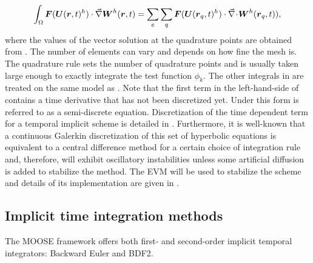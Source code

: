 %
\begin{align}\label{en:va_system_weak5}
\int_\Omega \boldsymbol F(\boldsymbol U(\boldsymbol r, t)^h) \cdot \vec{\nabla} \boldsymbol W^h(\boldsymbol r, t) = \sum_e \sum_q \boldsymbol F(\boldsymbol U(\boldsymbol r_q, t)^h) \cdot \vec{\nabla}\! \cdot \! \boldsymbol W^h (\boldsymbol r_q, t)),
\end{align}
%
where the values of the vector solution at the quadrature points are obtained from . The number of elements can vary and depends on how fine the mesh is. The quadrature rule sets the number of quadrature points and is usually taken large enough to exactly integrate the test function $\phi_k$. The other integrals in  are treated on the same model as . Note that the first term in the left-hand-side of   contains a time derivative that has not been discretized yet. Under this form  is referred to as a semi-discrete equation. Discretization of the time dependent term for a temporal implicit scheme is detailed in .
Furthermore, it is well-known
that a continuous Galerkin discretization of this set of hyperbolic
equations is equivalent to a central difference method for a certain
choice of integration rule and, therefore, will exhibit oscillatory
instabilities unless some artificial diffusion is added to stabilize
the method. The EVM will be used to stabilize the scheme and details of its implementation are given in .
%
\subsection{Implicit time integration methods}\label{sec:temp_implicit}
%
The MOOSE framework offers both first- and second-order implicit temporal integrators: Backward Euler and BDF2.
%
